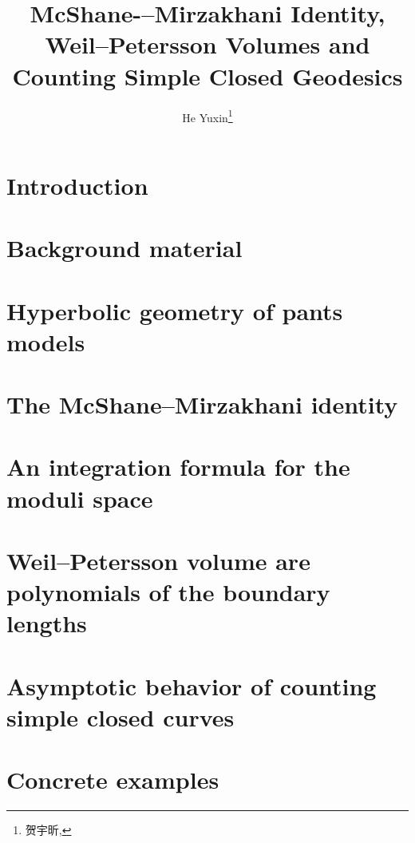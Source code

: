 \documentclass[twoside]{article}
\begin{document}
\title{McShane-–Mirzakhani Identity,\\Weil–Petersson Volumes and\\Counting Simple Closed Geodesics}
\author{He Yuxin\footnote{贺宇昕, }}

\begin{abstract}

\end{abstract}

\section{Introduction} \label{intro}




\section{Background material} \label{backg}




\section{Hyperbolic geometry of pants models} \label{hypergeo}




\section{The McShane--Mirzakhani identity} \label{MMid}




\section{An integration formula for the moduli space} \label{intformula}




\section{Weil--Petersson volume are polynomials of the boundary lengths} \label{wpvolume}



\section{Asymptotic behavior of counting simple closed curves} \label{asym}




\section{Concrete examples} \label{conexamples}



\printbibliography
\end{document}
